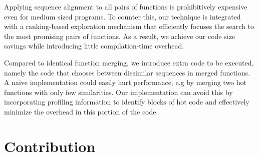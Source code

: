 Applying sequence alignment to all pairs of functions is prohibitively expensive even for medium sized programs.
To counter this, our technique is integrated with a ranking-based exploration mechanism that efficiently focuses the search to the most
promising pairs of functions. %
As a result, we achieve our code size savings while introducing little compilation-time
overhead.

Compared to identical function merging, we introduce extra code to be executed,
namely the code that chooses between dissimilar sequences in merged functions.
A naive implementation could easily hurt performance, e.g by merging two hot functions
with only few similarities. Our implementation can avoid this by incorporating
profiling information to identify blocks of hot code and effectively minimize 
the overhead in this portion of the code.

\section{Contribution}


